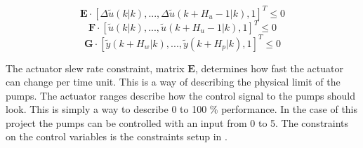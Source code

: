 \begin{equation}
\pmb{E} \cdot [\Delta\tilde u(k|k),...,\Delta\tilde u(k+H_u-1|k),1]^T \leq 0 
\label{eq:slewrate}
\end{equation}
\begin{equation}
\pmb{F} \cdot [\tilde u(k|k),...,\tilde u(k+H_u-1|k),1]^T \leq 0 
\label{eq:actranges}
\end{equation}
\begin{equation}
\pmb{G} \cdot [\tilde y(k+H_w|k),...,\tilde y(k+H_p|k),1]^T \leq 0
\label{eq:controlvar}
\end{equation}

The actuator slew rate constraint, matrix $\pmb{E}$, determines how fast the actuator can change per time unit. This is a way of describing the physical limit of the pumps. The actuator ranges describe how the control signal to the pumps should look. This is simply a way to describe 0 to 100 \% performance. In the case of this project the pumps can be controlled with an input from 0 to 5. The constraints on the control variables is the constraints setup in . 








